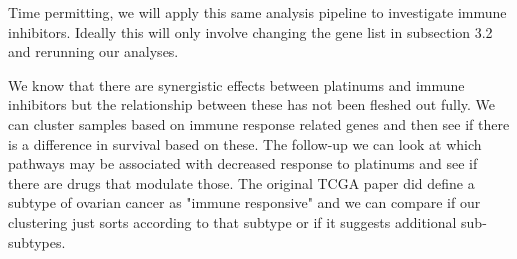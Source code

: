 \documentclass{article}
\begin{document}
Time permitting, we will apply this same analysis pipeline to investigate immune inhibitors. Ideally this will only involve changing the gene list in subsection 3.2 and rerunning our analyses. 

We know that there are synergistic effects between platinums and immune inhibitors but the relationship between these has not been fleshed out fully.  We can cluster samples based on immune response related genes and then see if there is a difference in survival based on these. The follow-up we can look at which pathways may be associated with decreased response to platinums and see if there are drugs that modulate those. The original TCGA paper did define a subtype of ovarian cancer as "immune responsive" and we can compare if our clustering just sorts according to that subtype or if it suggests additional sub-subtypes. 



{}

\end{document}
